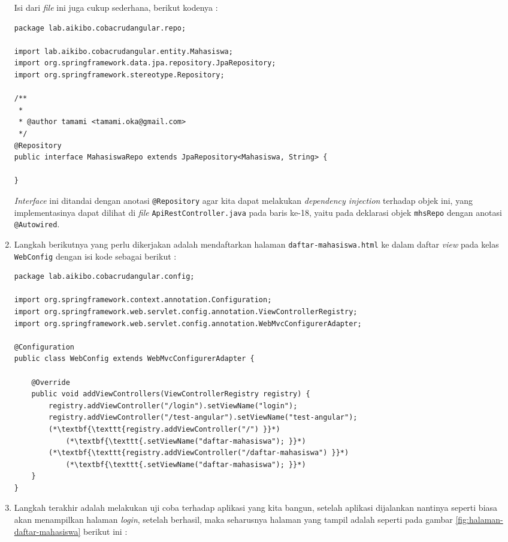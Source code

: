 \begin{enumerate}
	Isi dari \textit{file} ini juga cukup sederhana, berikut kodenya :
	
	\begin{lstlisting}
package lab.aikibo.cobacrudangular.repo;

import lab.aikibo.cobacrudangular.entity.Mahasiswa;
import org.springframework.data.jpa.repository.JpaRepository;
import org.springframework.stereotype.Repository;

/**
 *
 * @author tamami <tamami.oka@gmail.com>
 */
@Repository
public interface MahasiswaRepo extends JpaRepository<Mahasiswa, String> {
   
}
	\end{lstlisting}
	
	\textit{Interface} ini ditandai dengan anotasi \texttt{@Repository} agar kita dapat melakukan \textit{dependency injection} terhadap objek ini, yang implementasinya dapat dilihat di \textit{file} \texttt{ApiRestController.java} pada baris ke-18, yaitu pada deklarasi objek \texttt{mhsRepo} dengan anotasi \texttt{@Autowired}. 
	
	\item Langkah berikutnya yang perlu dikerjakan adalah mendaftarkan halaman \texttt{daftar-mahasiswa.html} ke dalam daftar \textit{view} pada kelas \texttt{WebConfig} dengan isi kode sebagai berikut :
	
	\begin{lstlisting}
package lab.aikibo.cobacrudangular.config;

import org.springframework.context.annotation.Configuration;
import org.springframework.web.servlet.config.annotation.ViewControllerRegistry;
import org.springframework.web.servlet.config.annotation.WebMvcConfigurerAdapter;

@Configuration
public class WebConfig extends WebMvcConfigurerAdapter {

	@Override
	public void addViewControllers(ViewControllerRegistry registry) {
		registry.addViewController("/login").setViewName("login");
		registry.addViewController("/test-angular").setViewName("test-angular");
        (*\textbf{\texttt{registry.addViewController("/") }}*)       
            (*\textbf{\texttt{.setViewName("daftar-mahasiswa"); }}*)
        (*\textbf{\texttt{registry.addViewController("/daftar-mahasiswa") }}*)
            (*\textbf{\texttt{.setViewName("daftar-mahasiswa"); }}*)
	}
}
	\end{lstlisting}
	
	\item Langkah terakhir adalah melakukan uji coba terhadap aplikasi yang kita bangun, setelah aplikasi dijalankan nantinya seperti biasa akan menampilkan halaman \textit{login}, setelah berhasil, maka seharusnya halaman yang tampil adalah seperti pada gambar \ref{fig:halaman-daftar-mahasiswa} berikut ini :
	

\end{enumerate}
